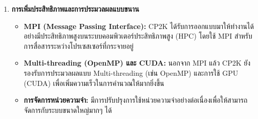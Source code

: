 \begin{enumerate}[topsep=0pt,noitemsep]
    \item \textbf{การเพิ่มประสิทธิภาพและการประมวลผลแบบขนาน}
    \begin{itemize}
        \item \textbf{MPI (Message Passing Interface):} CP2K ได้รับการออกแบบมาให้ทำงานได้อย่างมีประสิทธิภาพสูงบนระบบคอมพิวเตอร์ประสิทธิภาพสูง (HPC) โดยใช้ MPI สำหรับการสื่อสารระหว่างโปรเซสเซอร์ที่กระจายอยู่
        \item \textbf{Multi-threading (OpenMP) และ CUDA:} นอกจาก MPI แล้ว CP2K ยังรองรับการประมวลผลแบบ Multi-threading (เช่น OpenMP) และการใช้ GPU (CUDA) เพื่อเพิ่มความเร็วในการคำนวณให้มากยิ่งขึ้น
        \item \textbf{การจัดการหน่วยความจำ:} มีการปรับปรุงการใช้หน่วยความจำอย่างต่อเนื่องเพื่อให้สามารถจัดการกับระบบขนาดใหญ่มากๆ ได้
    \end{itemize}
\end{enumerate}
